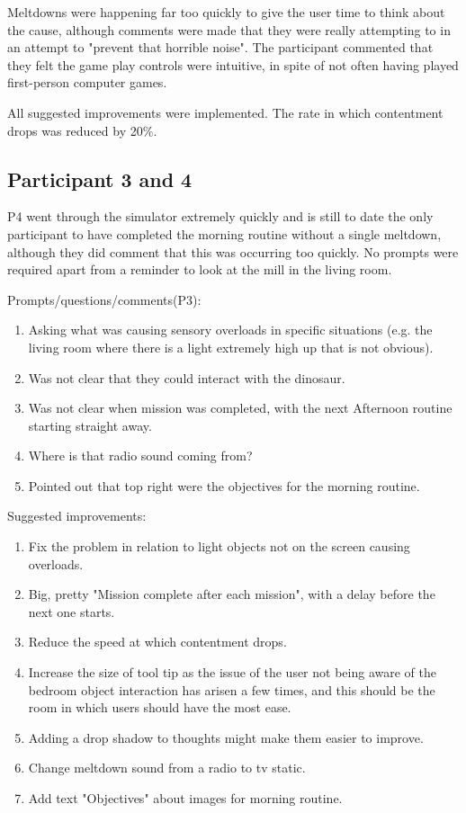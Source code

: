 \documentclass[11pt]{report}
\begin{document}
Meltdowns were happening far too quickly to give the user time to think about the cause, although comments were made that they were really attempting to in an attempt to "prevent that horrible noise". The participant commented that they felt the game play controls were intuitive, in spite of not often having played first-person computer games. 

All suggested improvements were implemented. The rate in which contentment drops was reduced by 20\%.

\subsection*{Participant 3 and 4}
P4 went through the simulator extremely quickly and is still to date the only participant to have completed the morning routine without a single meltdown, although they did comment that this was occurring too quickly. No prompts were required apart from a reminder to look at the mill in the living room. 


Prompts/questions/comments(P3):
\begin{enumerate}
\item Asking what was causing sensory overloads in specific situations (e.g. the living room where there is a light extremely high up that is not obvious).
\item Was not clear that they could interact with the dinosaur.
\item Was not clear when mission was completed, with the next Afternoon routine starting straight away.
\item Where is that radio sound coming from?
\item Pointed out that top right were the objectives for the morning routine.
\end{enumerate}

Suggested improvements:
\begin{enumerate}
\item Fix the problem in relation to light objects not on the screen causing overloads.
\item Big, pretty "Mission complete after each mission", with a delay before the next one starts.
\item Reduce the speed at which contentment drops.
\item Increase the size of tool tip as the issue of the user not being aware of the bedroom object interaction has arisen a few times, and this should be the room in which users should have the most ease. 
\item Adding a drop shadow to thoughts might make them easier to improve.
\item Change meltdown sound from a radio to tv static. 
\item Add text "Objectives" about images for morning routine. 
\end{enumerate}
\end{document}
